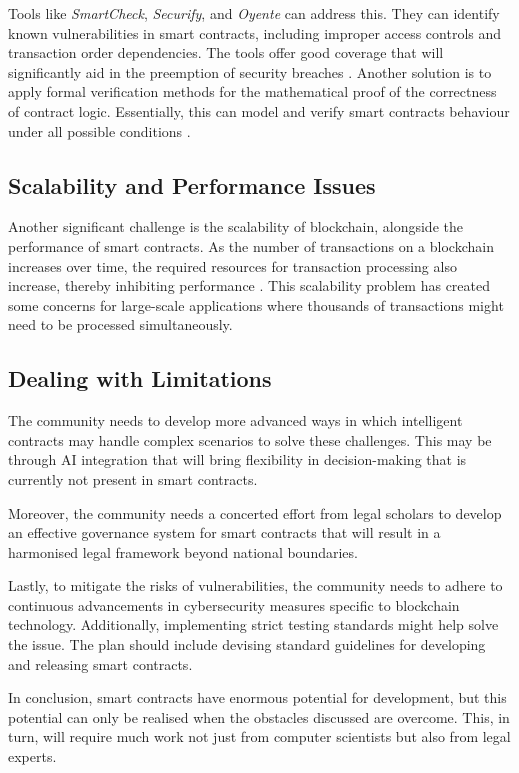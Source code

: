 Tools like \textit{SmartCheck}, \textit{Securify}, and \textit{Oyente} can address this. They can identify known vulnerabilities in smart contracts, including improper access controls and transaction order dependencies. The tools offer good coverage that will significantly aid in the preemption of security breaches \cite{ZhouEtAl2022}. Another solution is to apply formal verification methods for the mathematical proof of the correctness of contract logic. Essentially, this can model and verify smart contracts behaviour under all possible conditions \cite{ZhouEtAl2022}.

\subsection{Scalability and Performance Issues}

Another significant challenge is the scalability of blockchain, alongside the performance of smart contracts. As the number of transactions on a blockchain increases over time, the required resources for transaction processing also increase, thereby inhibiting performance \cite{Scherer2017, UllahEtAl2023}. This scalability problem has created some concerns for large-scale applications where thousands of transactions might need to be processed simultaneously.

\subsection{Dealing with Limitations}

The community needs to develop more advanced ways in which intelligent contracts may handle complex scenarios to solve these challenges. This may be through AI integration that will bring flexibility in decision-making that is currently not present in smart contracts.

Moreover, the community needs a concerted effort from legal scholars to develop an effective governance system for smart contracts that will result in a harmonised legal framework beyond national boundaries.

Lastly, to mitigate the risks of vulnerabilities, the community needs to adhere to continuous advancements in cybersecurity measures specific to blockchain technology. Additionally, implementing strict testing standards might help solve the issue. The plan should include devising standard guidelines for developing and releasing smart contracts.

In conclusion, smart contracts have enormous potential for development, but this potential can only be realised when the obstacles discussed are overcome. This, in turn, will require much work not just from computer scientists but also from legal experts.

